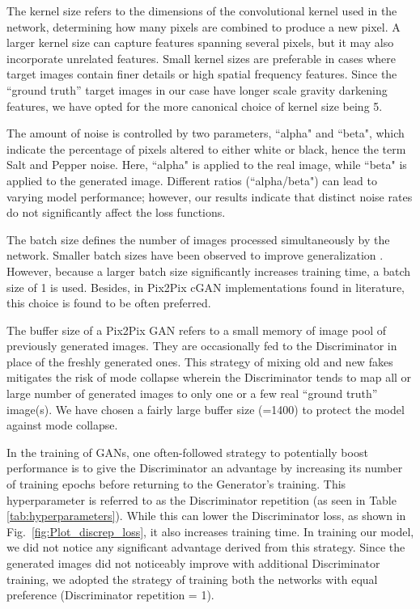 The kernel size refers to the dimensions of the convolutional kernel used in the network, determining how many pixels are combined to produce a new pixel. A larger kernel size can capture features spanning several pixels, but it may also incorporate unrelated features. Small kernel sizes are preferable in cases where target images contain finer details or high spatial frequency features. Since the ``ground truth'' target images in our case have longer scale gravity darkening features, we have opted for the more canonical choice of kernel size being 5.

The amount of noise is controlled by two parameters, ``alpha" and ``beta", which indicate the percentage of pixels altered to either white or black, hence the term Salt and Pepper noise. Here, ``alpha" is applied to the real image, while ``beta" is applied to the generated image. Different ratios (``alpha/beta") can lead to varying model performance; however, our results indicate that distinct noise rates do not significantly affect the loss functions. 

The batch size defines the number of images processed simultaneously by the network. Smaller batch sizes have been observed to improve generalization \citep{prince2023understanding}. However, because a larger batch size significantly increases training time, a batch size of 1 is used. Besides, in Pix2Pix cGAN implementations found in literature, this choice is found to be often preferred.

The buffer size of a Pix2Pix GAN refers to a small memory of image pool of previously generated images. They are occasionally fed to the Discriminator in place of the freshly generated ones. This strategy of mixing old and new fakes  mitigates the risk of mode collapse wherein the Discriminator tends to map all or large number of generated images to only one or a few real ``ground truth'' image(s). We have chosen a fairly large buffer size (=1400) to protect the model against mode collapse.


In the training of GANs, one often-followed strategy to potentially boost performance is to give the Discriminator an advantage by increasing its number of training epochs before returning to the Generator's training. This hyperparameter is referred to as the Discriminator repetition (as seen in Table \ref{tab:hyperparameters}). While this can lower the Discriminator loss, as shown in Fig.~\ref{fig:Plot_discrep_loss}, it also increases training time. In training our model, we did not notice any significant advantage derived from this strategy. Since the generated images did not noticeably improve with additional Discriminator training, we adopted the strategy of training both the networks with equal preference (Discriminator repetition = 1).

